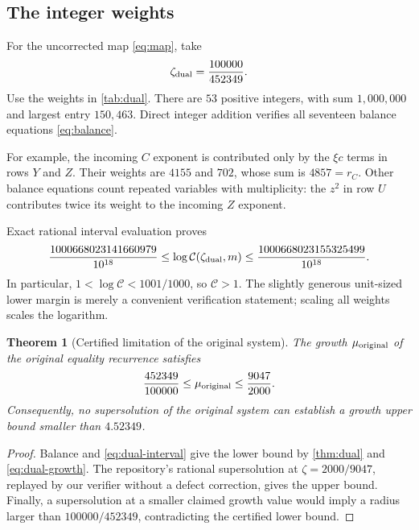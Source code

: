 \documentclass[11pt,a4paper]{article}
\newtheorem{theorem}{Theorem}[section]
\theoremstyle{definition}
\theoremstyle{remark}
\begin{document}
\subsection{The integer weights}
For the uncorrected map \eqref{eq:map}, take
\[
 \zeta_{\rm dual}=\frac{100000}{452349}.
\]
Use the weights in \cref{tab:dual}. There are $53$ positive integers, with
sum $1,000,000$ and largest entry $150,463$. Direct integer addition verifies
all seventeen balance equations \eqref{eq:balance}.

\begin{table}[htbp]
\centering\small

\caption{An explicit balanced-monomial certificate. The coefficient of every
monomial is one. Within each coordinate row, weights follow the term order
in \eqref{eq:map}.}
\label{tab:dual}
\end{table}

For example, the incoming $C$ exponent is contributed only by the
$\xi c$ terms in rows $Y$ and $Z$. Their weights are $4155$ and $702$,
whose sum is $4857=r_C$. Other balance equations count repeated variables
with multiplicity: the $z^2$ in row $U$ contributes twice its weight to the
incoming $Z$ exponent.

Exact rational interval evaluation proves
\begin{equation}\label{eq:dual-interval}
 \frac{1000668023141660979}{10^{18}}
 \leq \log\mathcal C(\zeta_{\rm dual},m)
 \leq \frac{1000668023155325499}{10^{18}}.
\end{equation}
In particular, $1<\log\mathcal C<1001/1000$, so
$\mathcal C>1$. The slightly generous unit-sized lower margin is merely a
convenient verification statement; scaling all weights scales the logarithm.

\begin{theorem}[Certified limitation of the original system]\label{thm:bracket}
The growth $\mu_{\rm original}$ of the original equality recurrence satisfies
\[
 \frac{452349}{100000}\leq\mu_{\rm original}\leq\frac{9047}{2000}.
\]
Consequently, no supersolution of the original system can establish a growth
upper bound smaller than $4.52349$.
\end{theorem}
\begin{proof}
Balance and \eqref{eq:dual-interval} give the lower bound by
\cref{thm:dual} and \eqref{eq:dual-growth}. The repository's rational
supersolution at $\zeta=2000/9047$, replayed by our verifier without a defect
correction, gives the upper bound. Finally, a supersolution at a smaller
claimed growth value would imply a radius larger than
$100000/452349$, contradicting the certified lower bound.
\end{proof}
\end{document}
